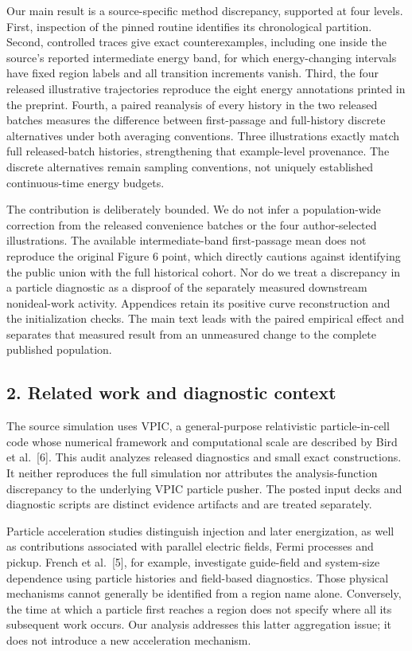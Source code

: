 Our main result is a source-specific method discrepancy, supported at
four levels. First, inspection of the pinned routine identifies its
chronological partition. Second, controlled traces give exact
counterexamples, including one inside the source's reported intermediate
energy band, for which energy-changing intervals have fixed region
labels and all transition increments vanish. Third, the four released
illustrative trajectories reproduce the eight energy annotations printed
in the preprint. Fourth, a paired reanalysis of every history in the two
released batches measures the difference between first-passage and
full-history discrete alternatives under both averaging conventions.
Three illustrations exactly match full released-batch histories,
strengthening that example-level provenance. The discrete alternatives
remain sampling conventions, not uniquely established continuous-time
energy budgets.

The contribution is deliberately bounded. We do not infer a
population-wide correction from the released convenience batches or the
four author-selected illustrations. The available intermediate-band
first-passage mean does not reproduce the original Figure 6 point, which
directly cautions against identifying the public union with the full
historical cohort. Nor do we treat a discrepancy in a particle
diagnostic as a disproof of the separately measured downstream
nonideal-work activity. Appendices retain its positive curve
reconstruction and the initialization checks. The main text leads with
the paired empirical effect and separates that measured result from an
unmeasured change to the complete published population.

\subsection{2. Related work and diagnostic
context}\label{related-work-and-diagnostic-context}

The source simulation uses VPIC, a general-purpose relativistic
particle-in-cell code whose numerical framework and computational scale
are described by Bird et al.~{[}6{]}. This audit analyzes released
diagnostics and small exact constructions. It neither reproduces the
full simulation nor attributes the analysis-function discrepancy to the
underlying VPIC particle pusher. The posted input decks and diagnostic
scripts are distinct evidence artifacts and are treated separately.

Particle acceleration studies distinguish injection and later
energization, as well as contributions associated with parallel electric
fields, Fermi processes and pickup. French et al.~{[}5{]}, for example,
investigate guide-field and system-size dependence using particle
histories and field-based diagnostics. Those physical mechanisms cannot
generally be identified from a region name alone. Conversely, the time
at which a particle first reaches a region does not specify where all
its subsequent work occurs. Our analysis addresses this latter
aggregation issue; it does not introduce a new acceleration mechanism.

